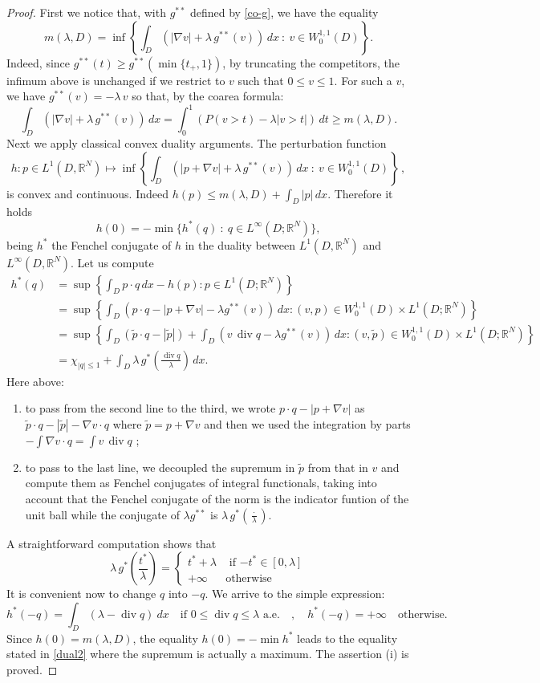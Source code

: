 \documentclass[reqno,11pt]{amsart}
\theoremstyle{definition}
\numberwithin{equation}{section}
\DeclareMathOperator{\Div}{div}
\def\R{\mathbb{R}}
\newcommand{\1}{{{\bf 1}\kern-0,28em\rm l}}
\newcommand{\aco}[1]{\left\{#1\right\}}
\def\l{\lambda}
\begin{document}
\begin{proof} First we notice that, with  $g^{**}$ defined by \eqref{co-g}, we have the equality
$$  m(\l,D) = \inf \left\{ \int_D (|\nabla v| + \lambda \, g^{**}(v))\, dx\ :\ v\in W^{1,1}_0(D)\right\}.$$
Indeed, since $g^{**}(t) \ge g^{**}( \min\{t_+,1\})$, by truncating the competitors, the infimum above is unchanged if we restrict to $v$ such that $0\le v\le 1$. For such a $v$, we have $g^{**}(v)=-\l\, v$ so that, by the coarea formula:
$$\int_D (|\nabla v| + \lambda \, g^{**}(v))\, dx = \int_0^1 \left(P(v>t) - \l |v>t|\right)\, dt \ge  m(\l, D) .$$
Next we apply classical convex duality arguments. The perturbation function
$$ h: p\in L^1(D,\R^N) \mapsto   \inf \left\{ \int_D (|p+ \nabla v| + \lambda \, g^{**}(v))\, dx\ :\ v\in W^{1,1}_0(D)\right\} \, ,$$
is convex and continuous. Indeed $h(p) \le m(\l,D) + \int_D |p|\, dx$. Therefore it holds
$$   h(0) = - \min \{h^*(q) \ :\ q\in L^\infty(D;\R^N)\} ,$$
being $h^*$ the Fenchel conjugate of $h$ in the duality between $L^1(D,\R^N)$ and $L^\infty(D,\R^N)$. Let us compute
\begin{align*} h^*(q)  &=  \sup \aco{\int_D p\cdot q \, dx - h(p) : p\in L^1(D;\R^N)} \\
&=  \sup \aco{\int_D \left(p\cdot q  - |p+\nabla v| - \l g^{**}(v) \right)\, dx : (v, p)\in W^{1,1}_0(D)\times L^1(D;\R^N)}\\
 &=\sup \aco{\int_D \left(\tilde p\cdot q  - |\tilde p|\right)  +   \int_D \left(v \,  \Div q - \l g^{**}(v)\right)  \, dx  : (v,\tilde p)\in W^{1,1}_0(D)\times L^1(D;\R^N)} \\
 &= \chi_{|q|\le 1} + \int_D  \l\,  g^*\left(\frac{\Div q}{\l}\right)  \, dx .
 \end{align*}
 Here above:
 \begin{enumerate}
\item [-] to pass from the second line to the third, we wrote $p\cdot q  - |p+\nabla v|$ as $ \tilde p\cdot q  - |\tilde p| - \nabla v \cdot q$ where 
$\tilde p = p+\nabla v$ and then  we used the integration by parts  $-\int \nabla v \cdot q= \int v \,  \Div q$ ;  
\item [-]to pass to the last line, we decoupled the supremum in $\tilde p$ from that  in $v$ and compute them as Fenchel conjugates of integral functionals, 
taking into account that the Fenchel conjugate of the norm is the indicator funtion of the unit ball while the conjugate of  $\l g^{**}$ is
 $\l\, g^*(\frac{\cdot}{\l})$.  
\end{enumerate}
A straightforward computation shows that 
$$\l\, g^*\left(\frac{t^*}{\l}\right)= \begin{cases}  t^* +\l  & \text{ if $-t^* \in [0,\l]$} \\ +\infty & \text{otherwise} \end{cases} $$
It is convenient now to change $q$ into $-q$. We arrive to the simple expression:
$$ h^*(-q) =  \int_D (\l -\Div q)\ dx \quad \text{if $0\le \Div q\le \l$ \ a.e.}  \quad,\quad  h^*(-q) =+\infty \quad \text{otherwise}.$$
Since $h(0)= m(\l,D)$, the equality $h(0)= - \min h^*$ leads to the equality stated in \eqref{dual2} where the supremum is actually a maximum. 
The assertion (i) is proved.


\end{proof}
\end{document}
